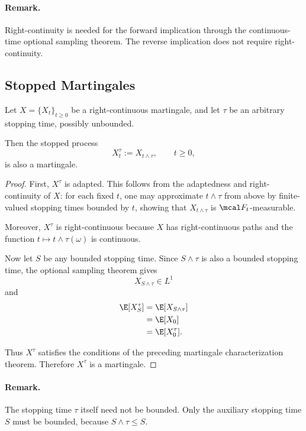 \paragraph{Remark.}
Right-continuity is needed for the forward implication
through the continuous-time optional sampling theorem.
The reverse implication does not require right-continuity.

\subsection{Stopped Martingales}

\begin{corollary}
Let $X=\{X_t\}_{t\geq0}$ be a right-continuous
martingale, and let $\tau$ be an arbitrary stopping
time, possibly unbounded.

Then the stopped process
\[
    X_t^\tau:=X_{t\wedge\tau},
    \qquad t\geq0,
\]
is also a martingale.
\end{corollary}

\begin{proof}
First, $X^\tau$ is adapted. This follows from the
adaptedness and right-continuity of $X$: for each
fixed $t$, one may approximate $t\wedge\tau$
from above by finite-valued stopping times bounded
by $t$, showing that $X_{t\wedge\tau}$ is
$\mcal F_t$-measurable.

Moreover, $X^\tau$ is right-continuous because $X$
has right-continuous paths and the function
$t\mapsto t\wedge\tau(\omega)$ is continuous.

Now let $S$ be any bounded stopping time.
Since $S\wedge\tau$ is also a bounded stopping time,
the optional sampling theorem gives
\[
    X_{S\wedge\tau}\in L^1
\]
and
\[
\begin{aligned}
    \E[X_S^\tau]
    &=\E[X_{S\wedge\tau}]\\
    &=\E[X_0]\\
    &=\E[X_0^\tau].
\end{aligned}
\]

Thus $X^\tau$ satisfies the conditions of the
preceding martingale characterization theorem.
Therefore $X^\tau$ is a martingale.
\end{proof}

\paragraph{Remark.}
The stopping time $\tau$ itself need not be bounded.
Only the auxiliary stopping time $S$ must be bounded,
because $S\wedge\tau\leq S$.

